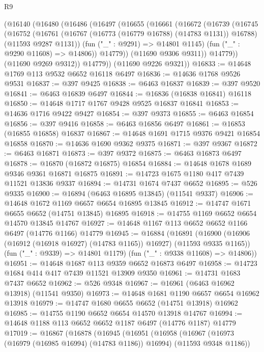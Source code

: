 \begin{lexlean}{R9}
\begin{coremodule}
    (@16140
      (@16480
        (@16486
          (@16497
            (@16655
              (@16661
                (@16672
                  (@16739
                    (@16745
                      (@16752
                        (@16761
                          (@16767 (@16773 (@16779 @16788) (@14783 @1131)) @16788)
                          (@11593 @9287 @1131))
                        (fun ("_" : @9291) => @14801 @1145)
                        (fun ("_" : @9290 @11608) => @14806))
                      @14779))
                  (@11690 @9306 @9311))
                @14779))
            (@11690 @9269 @9312))
          @14779))
      (@11690 @9226 @9321))
@16833 := @14648 @1769 @113 @9532 @6652 @16118 @6497
@16836 := @14636 @1768 @9526 @9531
@16837 := @397 @9425
@16838 := @6463 @16837
@16839 := @397 @9520
@16841 := @6463 @16839 @6497
@16844 := @16836 (@16838 @16841) @16118
@16850 := @14648 @1717 @1767 @9428 @9525 @16837 @16841
@16853 := @14636 @1716 @9422 @9427
@16854 := @397 @9373
@16855 := @6463 @16854
@16856 := @397 @9416
@16858 := @6463 @16856 @6497
@16861 := @16853 (@16855 @16858) @16837
@16867 := @14648 @1691 @1715 @9376 @9421 @16854 @16858
@16870 := @14636 @1690 @9362 @9375
@16871 := @397 @9367
@16872 := @6463 @16871
@16873 := @397 @9372
@16875 := @6463 @16873 @6497
@16878 := @16870 (@16872 @16875) @16854
@16884 := @14648 @1678 @1689 @9346 @9361 @16871 @16875
@16891 := @14723 @1675 @1180 @417 @7439 @11521 @13836 @9337
@16894 := @14731 @1674 @7437 @6652
@16895 := @526 @9335
@16900 := @16894 (@6463 @16895 @13845) (@11541 @9337)
@16906 := @14648 @1672 @1169 @6657 @6654 @16895 @13845
@16912 := @14747 @1671 @6655 @6652 (@14751 @13845) @16895
@16918 := @14755 @1169 @6652 @6654 @14570 @13845 @14767
@16927 := @14648 @1167 @113 @6652 @6652 @1166 @6497 (@14776 @1166) @14779
@16945 := @16884
    (@16891
      (@16900 (@16906 (@16912 (@16918 @16927) (@14783 @1165)) @16927) (@11593 @9335 @1165))
      (fun ("_" : @9339) => @14801 @1179)
      (fun ("_" : @9338 @11608) => @14806))
@16951 := @14648 @1687 @113 @9359 @6652 @16873 @6497
@16958 := @14723 @1684 @414 @417 @7439 @11521 @13909 @9350
@16961 := @14731 @1683 @7437 @6652
@16962 := @526 @9348
@16967 := @16961 (@6463 @16962 @13918) (@11541 @9350)
@16973 := @14648 @1681 @1190 @6657 @6654 @16962 @13918
@16979 := @14747 @1680 @6655 @6652 (@14751 @13918) @16962
@16985 := @14755 @1190 @6652 @6654 @14570 @13918 @14767
@16994 := @14648 @1188 @113 @6652 @6652 @1187 @6497 (@14776 @1187) @14779
@17019 := @16867
    (@16878
      (@16945
        (@16951
          (@16958
            (@16967 (@16973 (@16979 (@16985 @16994) (@14783 @1186)) @16994) (@11593 @9348 @1186))

\end{coremodule}
\end{lexlean}
